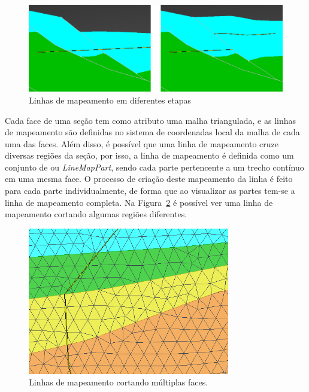 \begin{figure} [h]
  \begin{center}
    \includegraphics[width=420pt]{images/fig-linemap-history}
    \caption{Linhas de mapeamento em diferentes etapas}\label{fig-linemap-history}
  \end{center}
\end{figure}


Cada face de uma seção tem como atributo uma malha triangulada, e as linhas de mapeamento são definidas no sistema de coordenadas local da malha de cada uma das faces. Além disso, é possível que uma linha de mapeamento cruze diversas regiões da seção, por isso, a linha de mapeamento é definida como um conjunto de  ou \textit{LineMapPart}, sendo cada parte pertencente a um trecho contínuo em uma mesma face. O processo de criação deste mapeamento da linha é feito para cada parte individualmente, de forma que ao visualizar as partes tem-se a linha de mapeamento completa. Na Figura~\ref{fig-linemap-malhas} é possível ver uma linha de mapeamento cortando algumas regiões diferentes.

\begin{figure} [h]
  \begin{center}
    \includegraphics[width=250pt]{images/fig-linhas-de-mapeamento-malhas}
    \caption{Linhas de mapeamento cortando múltiplas faces.}\label{fig-linemap-malhas}
  \end{center}
\end{figure}

